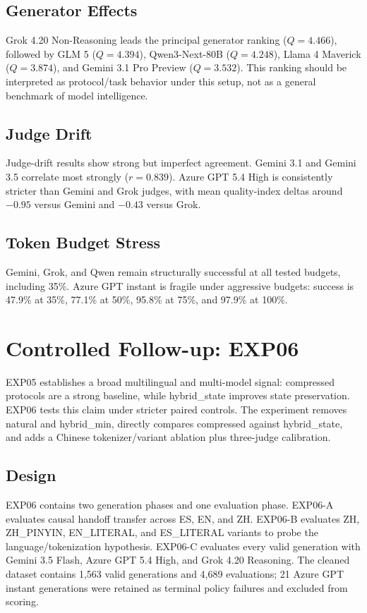 \documentclass[11pt]{article}
\begin{document}
\subsection{Generator Effects}
Grok 4.20 Non-Reasoning leads the principal generator ranking ($Q=4.466$), followed by GLM 5 ($Q=4.394$), Qwen3-Next-80B ($Q=4.248$), Llama 4 Maverick ($Q=3.874$), and Gemini 3.1 Pro Preview ($Q=3.532$). This ranking should be interpreted as protocol/task behavior under this setup, not as a general benchmark of model intelligence.

\subsection{Judge Drift}
Judge-drift results show strong but imperfect agreement. Gemini 3.1 and Gemini 3.5 correlate most strongly ($r=0.839$). Azure GPT 5.4 High is consistently stricter than Gemini and Grok judges, with mean quality-index deltas around $-0.95$ versus Gemini and $-0.43$ versus Grok.

\subsection{Token Budget Stress}
Gemini, Grok, and Qwen remain structurally successful at all tested budgets, including 35\%. Azure GPT instant is fragile under aggressive budgets: success is 47.9\% at 35\%, 77.1\% at 50\%, 95.8\% at 75\%, and 97.9\% at 100\%.

\section{Controlled Follow-up: EXP06}
\label{sec:exp06}

EXP05 establishes a broad multilingual and multi-model signal: compressed protocols are a strong baseline, while hybrid\_state improves state preservation. EXP06 tests this claim under stricter paired controls. The experiment removes natural and hybrid\_min, directly compares compressed against hybrid\_state, and adds a Chinese tokenizer/variant ablation plus three-judge calibration.

\subsection{Design}
EXP06 contains two generation phases and one evaluation phase. EXP06-A evaluates causal handoff transfer across ES, EN, and ZH. EXP06-B evaluates ZH, ZH\_PINYIN, EN\_LITERAL, and ES\_LITERAL variants to probe the language/tokenization hypothesis. EXP06-C evaluates every valid generation with Gemini 3.5 Flash, Azure GPT 5.4 High, and Grok 4.20 Reasoning. The cleaned dataset contains 1,563 valid generations and 4,689 evaluations; 21 Azure GPT instant generations were retained as terminal policy failures and excluded from scoring.
\end{document}
